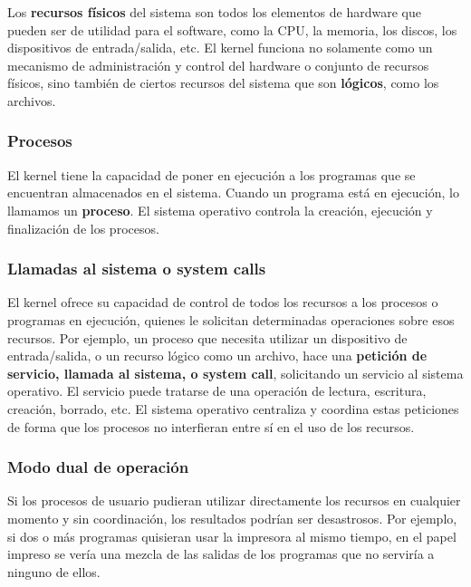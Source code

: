 \documentclass[spanish,a4paper,]{article}
\begin{document}
Los \textbf{recursos físicos} del sistema son todos los elementos de
hardware que pueden ser de utilidad para el software, como la CPU, la
memoria, los discos, los dispositivos de entrada/salida, etc. El kernel
funciona no solamente como un mecanismo de administración y control del
hardware o conjunto de recursos físicos, sino también de ciertos
recursos del sistema que son \textbf{lógicos}, como los archivos.

\hypertarget{procesos}{%
\subsubsection{Procesos}\label{procesos}}

El kernel tiene la capacidad de poner en ejecución a los programas que
se encuentran almacenados en el sistema. Cuando un programa está en
ejecución, lo llamamos un \textbf{proceso}. El sistema operativo
controla la creación, ejecución y finalización de los procesos.

\hypertarget{llamadas-al-sistema-o-system-calls}{%
\subsubsection{Llamadas al sistema o system
calls}\label{llamadas-al-sistema-o-system-calls}}

El kernel ofrece su capacidad de control de todos los recursos a los
procesos o programas en ejecución, quienes le solicitan determinadas
operaciones sobre esos recursos. Por ejemplo, un proceso que necesita
utilizar un dispositivo de entrada/salida, o un recurso lógico como un
archivo, hace una \textbf{petición de servicio, llamada al sistema, o
system call}, solicitando un servicio al sistema operativo. El servicio
puede tratarse de una operación de lectura, escritura, creación,
borrado, etc. El sistema operativo centraliza y coordina estas
peticiones de forma que los procesos no interfieran entre sí en el uso
de los recursos.

\hypertarget{modo-dual-de-operaciuxf3n}{%
\subsubsection{Modo dual de operación}\label{modo-dual-de-operaciuxf3n}}

Si los procesos de usuario pudieran utilizar directamente los recursos
en cualquier momento y sin coordinación, los resultados podrían ser
desastrosos. Por ejemplo, si dos o más programas quisieran usar la
impresora al mismo tiempo, en el papel impreso se vería una mezcla de
las salidas de los programas que no serviría a ninguno de ellos.
\end{document}
